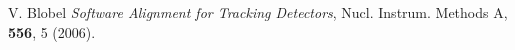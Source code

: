 \begin{thebibliography}{100}

 V. Blobel \textit{Software Alignment for Tracking Detectors}, Nucl. Instrum. Methods A, \textbf{556}, 5 (2006).   

\end{thebibliography}

\newpage{\pagestyle{empty}\cleardoublepage}